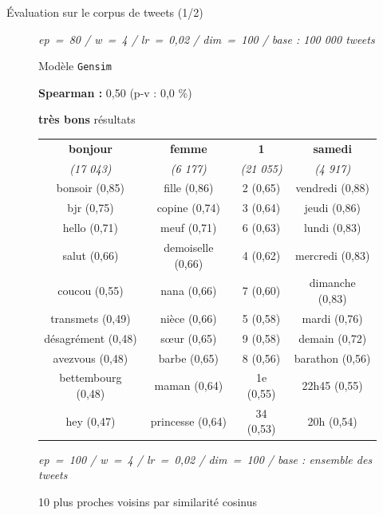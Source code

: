 \documentclass[10pt,xcolor=table,color={dvipsnames,usenames},ignorenonframetext,usepdftitle=false,french]{beamer}
\begin{document}
\begin{frame}{Évaluation sur le corpus de tweets (1/2)}
\begin{figure}
\begin{minipage}{.6\textwidth}
\begin{table}[!h]
\begin{center}
\end{center}
\emph{ep = 80 / w = 4 / lr = 0,02 / dim = 100 / base : 100 000 tweets}

\end{table}
\normalsize


\end{minipage}
\end{figure}

\pause

\begin{figure}
\begin{minipage}{.4\textwidth}

Modèle \texttt{Gensim}

\medskip

\footnotesize
\textbf{ Spearman : } 0,50 (p-v : 0,0 \%)
\normalsize

\medskip

\faArrowCircleRight{} \textbf{très bons} résultats

\end{minipage}%
\begin{minipage}{.6\textwidth}
\tiny

\begin{table}[h]
\begin{center}
\begin{tabular}{|c|c|c|c|}
    \hline
\textbf{bonjour} & \textbf{femme} & \textbf{1} & \textbf{samedi} \tabularnewline
\emph{(17 043)} & \emph{(6 177)} & \emph{(21 055)} & \emph{(4 917)} \tabularnewline
       \hline
bonsoir (0,85) & fille (0,86) & 2 (0,65) & vendredi (0,88) \tabularnewline
bjr (0,75) & copine (0,74) & 3 (0,64) & jeudi (0,86) \tabularnewline
hello (0,71) & meuf (0,71) & 6 (0,63) & lundi (0,83) \tabularnewline
salut (0,66) & demoiselle (0,66) & 4 (0,62) & mercredi (0,83) \tabularnewline
coucou (0,55) & nana (0,66) & 7 (0,60) & dimanche (0,83) \tabularnewline
transmets (0,49) & nièce (0,66) & 5 (0,58) & mardi (0,76) \tabularnewline
désagrément (0,48) & sœur (0,65) & 9 (0,58) & demain (0,72) \tabularnewline
avezvous (0,48) & barbe (0,65) & 8 (0,56) & barathon (0,56) \tabularnewline
bettembourg (0,48) & maman (0,64) & 1e (0,55) & 22h45 (0,55) \tabularnewline
hey (0,47) & princesse (0,64) & 34 (0,53) & 20h (0,54) \tabularnewline
    \hline
 \end{tabular}
\captionsetup{margin=0cm,format=hang,justification=justified}
\end{center}
\emph{ep = 100 / w = 4 / lr = 0,02 / dim = 100 / base : ensemble des tweets}

\medskip

\footnotesize{10 plus proches voisins par similarité cosinus}
\end{table}

\normalsize

\end{minipage}
\end{figure}

\end{frame}
\end{document}
